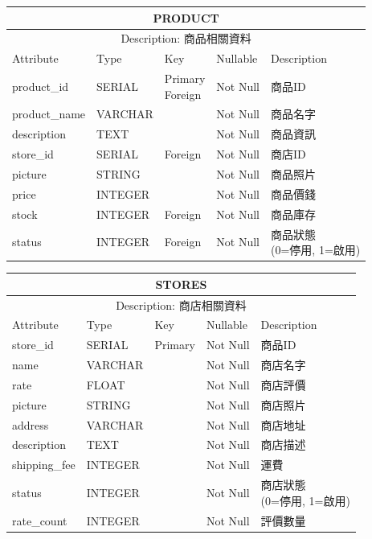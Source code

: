 \documentclass[a4paper, 12pt]{article}
\begin{document}
\noindent\begin{tabular}{ | p{7em} | p{5.5em} | p{5.5em} | p{4.5em} | p{11em} |}
  \hline
  \multicolumn{5}{|c|}{PRODUCT} \tabularnewline
  \hline 
  \multicolumn{5}{|c|}{Description: 商品相關資料} \tabularnewline
  \hline 
  Attribute & Type & Key & Nullable & Description \\
  \hline
  product_id& SERIAL & \makecell[l]{Primary \\ Foreign}  & Not Null & 商品ID \\
  \hline
  product_name & VARCHAR & &Not Null &商品名字\\
  \hline
  description & TEXT & &Not Null &商品資訊\\
  \hline
  store_id & SERIAL &Foreign &Not Null &商店ID\\
  \hline
  picture & STRING & &Not Null &商品照片\\
  \hline
  price & INTEGER & &Not Null &商品價錢\\
  \hline
  stock & INTEGER & Foreign &Not Null &商品庫存\\
  \hline
  status & INTEGER & Foreign &Not Null &\makecell[l]{商品狀態\\(0=停用, 1=啟用)}\\
  \hline
\end{tabular}

\noindent\begin{tabular}{ | p{7em} | p{5.5em} | p{5.5em} | p{4.5em} | p{11em} |}
  \hline
  \multicolumn{5}{|c|}{STORES} \tabularnewline
  \hline 
  \multicolumn{5}{|c|}{Description: 商店相關資料} \tabularnewline
  \hline 
  Attribute & Type & Key & Nullable & Description \\
  \hline
  store_id& SERIAL & Primary & Not Null & 商品ID \\
  \hline
  name & VARCHAR & &Not Null &商店名字\\
  \hline
  rate & FLOAT & &Not Null &商店評價\\
  \hline
  picture & STRING & &Not Null &商店照片\\
  \hline
  address & VARCHAR & &Not Null &商店地址\\
  \hline
  description & TEXT & &Not Null &商店描述\\
  \hline
  shipping_fee & INTEGER & &Not Null &運費\\
  \hline
  status & INTEGER & &Not Null &\makecell[l]{商店狀態\\(0=停用, 1=啟用)}\\
  \hline
  rate_count & INTEGER & &Not Null &評價數量\\
  \hline
\end{tabular}
\vspace{1em}
\end{document}
